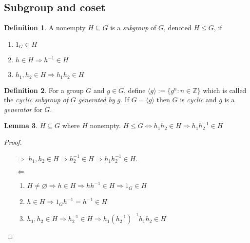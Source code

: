 \documentclass[a4paper]{article}
\theoremstyle{definition}
\newtheorem{defn}{Definition}[subsection]
\newtheorem{lemma}[defn]{Lemma}
\begin{document}
\subsection{Subgroup and coset}
\begin{defn}
A nonempty $H\subseteq G$ is a \textit{subgroup} of $G$, denoted $H\leq G$, if
\begin{enumerate}
\item $1_G\in H$
\item $h\in H\Rightarrow h^{-1}\in H$
\item $h_1,h_2\in H \Rightarrow h_1h_2\in H$
\end{enumerate}
\end{defn}
\begin{defn}
For a group $G$ and $g\in G$, define $\langle g\rangle:=\{g^n:n\in\mathbb Z\}$ which is called the \textit{cyclic subgroup of} $G$ \textit{generated by} $g$. If $G=\langle g\rangle$ then $G$ is \textit{cyclic} and $g$ is a \textit{generator} for $G$.
\end{defn}
\begin{lemma}
$H\subseteq G$ where $H$ nonempty. $H\leq G \Leftrightarrow h_1h_2\in H\Rightarrow h_1h_2^{-1}\in H$
\end{lemma}
\begin{proof}
\begin{itemize}
\item[$\Rightarrow$] $h_1,h_2\in H\Rightarrow h_2^{-1}\in H\Rightarrow h_1h_2^{-1}\in H$.
\item[$\Leftarrow$] \begin{enumerate}
\item $H\neq \varnothing\Rightarrow h\in H\Rightarrow hh^{-1}\in H\Rightarrow 1_G\in H$
\item $h\in H\Rightarrow 1_Gh^{-1}=h^{-1}\in H$
\item $h_1,h_2\in H\Rightarrow h_2^{-1}\in H\Rightarrow h_1(h_2^{-1})^{-1}h_1h_2\in H$
\end{enumerate}
\end{itemize}
\end{proof}
\end{document}
